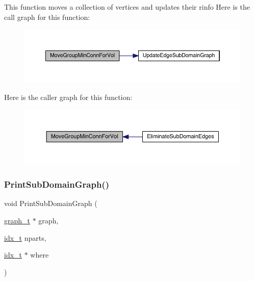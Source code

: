 This function moves a collection of vertices and updates their rinfo Here is the call graph for this function\+:\nopagebreak
\begin{figure}[H]
\begin{center}
\leavevmode
\includegraphics[width=350pt]{a00242_acab0293e31c438218cd4b37b608466c6_cgraph}
\end{center}
\end{figure}
Here is the caller graph for this function\+:\nopagebreak
\begin{figure}[H]
\begin{center}
\leavevmode
\includegraphics[width=350pt]{a00242_acab0293e31c438218cd4b37b608466c6_icgraph}
\end{center}
\end{figure}
\mbox{\label{a00242_a9723ce68d6093abc3aca1086e672cde9}} 
\subsubsection{\texorpdfstring{Print\+Sub\+Domain\+Graph()}{PrintSubDomainGraph()}}
{\footnotesize\ttfamily void Print\+Sub\+Domain\+Graph (\begin{DoxyParamCaption}\item[{\hyperlink{a00734}{graph\+\_\+t} $\ast$}]{graph,  }\item[{\hyperlink{a00876_aaa5262be3e700770163401acb0150f52}{idx\+\_\+t}}]{nparts,  }\item[{\hyperlink{a00876_aaa5262be3e700770163401acb0150f52}{idx\+\_\+t} $\ast$}]{where }\end{DoxyParamCaption})}

